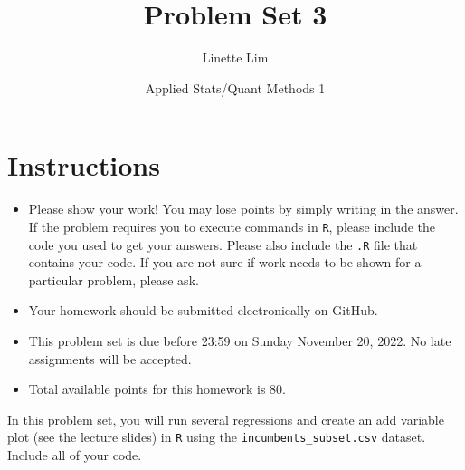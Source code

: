 \documentclass[12pt,letterpaper]{article}
\title{Problem Set 3}
\date{Applied Stats/Quant Methods 1}
\author{Linette Lim}
\begin{document}
	\maketitle
	\section*{Instructions}
	\begin{itemize}
		\item Please show your work! You may lose points by simply writing in the answer. If the problem requires you to execute commands in \texttt{R}, please include the code you used to get your answers. Please also include the \texttt{.R} file that contains your code. If you are not sure if work needs to be shown for a particular problem, please ask.
	\item Your homework should be submitted electronically on GitHub.
	\item This problem set is due before 23:59 on Sunday November 20, 2022. No late assignments will be accepted.
	\item Total available points for this homework is 80.
	\end{itemize}

		\vspace{.25cm}
	
\noindent In this problem set, you will run several regressions and create an add variable plot (see the lecture slides) in \texttt{R} using the \texttt{incumbents\_subset.csv} dataset. Include all of your code.

	\vspace{.5cm}
\end{document}
